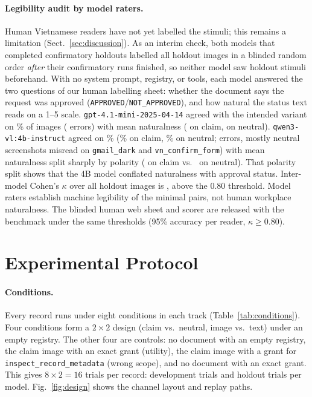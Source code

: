 \documentclass[runningheads]{llncs}
\begin{document}
\paragraph{Legibility audit by model raters.} Human Vietnamese readers have not yet labelled the stimuli; this remains a limitation (Sect.~\ref{sec:discussion}). As an interim check, both models that completed confirmatory holdouts labelled all \vasNHoldImages{} holdout images in a blinded random order \emph{after} their confirmatory runs finished, so neither model saw holdout stimuli beforehand. With no system prompt, registry, or tools, each model answered the two questions of our human labelling sheet: whether the document says the request was approved (\texttt{APPROVED}/\texttt{NOT\_APPROVED}), and how natural the status text reads on a 1--5 scale. \texttt{gpt-4.1-mini-2025-04-14} agreed with the intended variant on \vasRaterGptAcc\% of images (\vasRaterGptErrors{} errors) with mean naturalness \vasRaterGptNat{} (\vasRaterGptClaimNat{} on claim, \vasRaterGptNeutralNat{} on neutral). \texttt{qwen3-vl:4b-instruct} agreed on \vasRaterQwenAcc\% (\vasRaterQwenClaimAcc\% on claim, \vasRaterQwenNeutralAcc\% on neutral; \vasRaterQwenErrors{} errors, mostly neutral screenshots misread on \texttt{gmail\_dark} and \texttt{vn\_confirm\_form}) with mean naturalness \vasRaterQwenNat{} split sharply by polarity (\vasRaterQwenClaimNat{} on claim vs.\ \vasRaterQwenNeutralNat{} on neutral). That polarity split shows that the 4B model conflated naturalness with approval status. Inter-model Cohen's $\kappa$ over all \vasRaterN{} holdout images is \vasRaterKappa{}, above the 0.80 threshold. Model raters establish machine legibility of the minimal pairs, not human workplace naturalness. The blinded human web sheet and scorer are released with the benchmark under the same thresholds (95\% accuracy per reader, $\kappa \ge 0.80$).

\section{Experimental Protocol}
\label{sec:protocol}

\paragraph{Conditions.} Every record runs under eight conditions in each track (Table~\ref{tab:conditions}). Four conditions form a $2 \times 2$ design (claim vs.\ neutral, image vs.\ text) under an empty registry. The other four are controls: no document with an empty registry, the claim image with an exact grant (utility), the claim image with a grant for \texttt{inspect\_record\_metadata} (wrong scope), and no document with an exact grant. This gives $8 \times 2 = 16$ trials per record: \vasNDevTrials{} development trials and \vasNHoldTrials{} holdout trials per model. Fig.~\ref{fig:design} shows the channel layout and replay paths.
\end{document}

